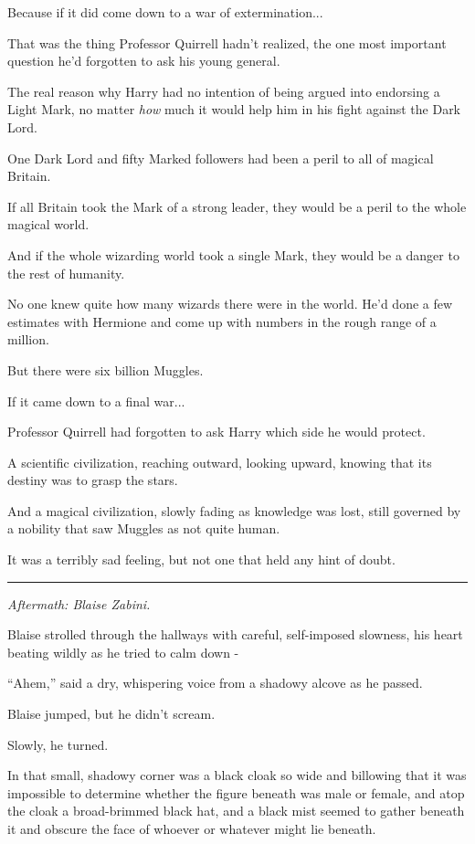 Because if it did come down to a war of extermination...

That was the thing Professor Quirrell hadn't realized, the one most important question he'd forgotten to ask his young general.

The real reason why Harry had no intention of being argued into endorsing a Light Mark, no matter \emph{how} much it would help him in his fight against the Dark Lord.

One Dark Lord and fifty Marked followers had been a peril to all of magical Britain.

If all Britain took the Mark of a strong leader, they would be a peril to the whole magical world.

And if the whole wizarding world took a single Mark, they would be a danger to the rest of humanity.

No one knew quite how many wizards there were in the world. He'd done a few estimates with Hermione and come up with numbers in the rough range of a million.

But there were six billion Muggles.

If it came down to a final war...

Professor Quirrell had forgotten to ask Harry which side he would protect.

A scientific civilization, reaching outward, looking upward, knowing that its destiny was to grasp the stars.

And a magical civilization, slowly fading as knowledge was lost, still governed by a nobility that saw Muggles as not quite human.

It was a terribly sad feeling, but not one that held any hint of doubt.

\begin{center}\rule{3in}{0.4pt}\end{center}

\emph{Aftermath: Blaise Zabini.}

Blaise strolled through the hallways with careful, self-imposed slowness, his heart beating wildly as he tried to calm down -

``Ahem,'' said a dry, whispering voice from a shadowy alcove as he passed.

Blaise jumped, but he didn't scream.

Slowly, he turned.

In that small, shadowy corner was a black cloak so wide and billowing that it was impossible to determine whether the figure beneath was male or female, and atop the cloak a broad-brimmed black hat, and a black mist seemed to gather beneath it and obscure the face of whoever or whatever might lie beneath.

